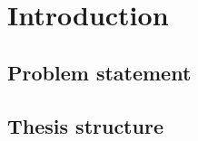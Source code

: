 

\chapter{Introduction} %

\label{Introduction} %


\newcommand{\keyword}[1]{\textbf{#1}}
\newcommand{\tabhead}[1]{\textbf{#1}}
\newcommand{\code}[1]{\texttt{#1}}
\newcommand{\file}[1]{\texttt{\bfseries#1}}
\newcommand{\option}[1]{\texttt{\itshape#1}}

\cite{marine_casualities_incidents_2016}
\cite{luinframework}
\cite{jokioinen2016remote}
\section{Problem statement}
\section{Thesis structure}